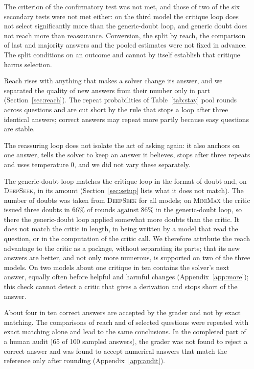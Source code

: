 \documentclass[11pt]{article}
\newcommand{\ds}{\textsc{DeepSeek}}
\newcommand{\mm}{\textsc{MiniMax}}
\begin{document}
The criterion of the confirmatory test was not met, and those of two of the six secondary tests were not met either: on the third model the critique loop does not select significantly more than the generic-doubt loop, and generic doubt does not reach more than reassurance.
Conversion, the split by reach, the comparison of last and majority answers and the pooled estimates were not fixed in advance.
The split conditions on an outcome and cannot by itself establish that critique harms selection.

Reach rises with anything that makes a solver change its answer, and we separated the quality of new answers from their number only in part (Section~\ref{sec:reach}).
The repeat probabilities of Table~\ref{tab:stay} pool rounds across questions and are cut short by the rule that stops a loop after three identical answers; correct answers may repeat more partly because easy questions are stable.

The reassuring loop does not isolate the act of asking again: it also anchors on one answer, tells the solver to keep an answer it believes, stops after three repeats and uses temperature 0, and we did not vary these separately.

The generic-doubt loop matches the critique loop in the format of doubt and, on \ds, in its amount (Section~\ref{sec:setup} lists what it does not match).
The number of doubts was taken from \ds{} for all models; on \mm{} the critic issued three doubts in 66\% of rounds against 86\% in the generic-doubt loop, so there the generic-doubt loop applied somewhat more doubts than the critic.
It does not match the critic in length, in being written by a model that read the question, or in the computation of the critic call.
We therefore attribute the reach advantage to the critic as a package, without separating its parts; that its new answers are better, and not only more numerous, is supported on two of the three models.
On two models about one critique in ten contains the solver's next answer, equally often before helpful and harmful changes (Appendix~\ref{app:more}); this check cannot detect a critic that gives a derivation and stops short of the answer.

About four in ten correct answers are accepted by the grader and not by exact matching.
The comparisons of reach and of selected questions were repeated with exact matching alone and lead to the same conclusions.
In the completed part of a human audit (65 of 100 sampled answers), the grader was not found to reject a correct answer and was found to accept numerical answers that match the reference only after rounding (Appendix~\ref{app:audit}).
\end{document}

